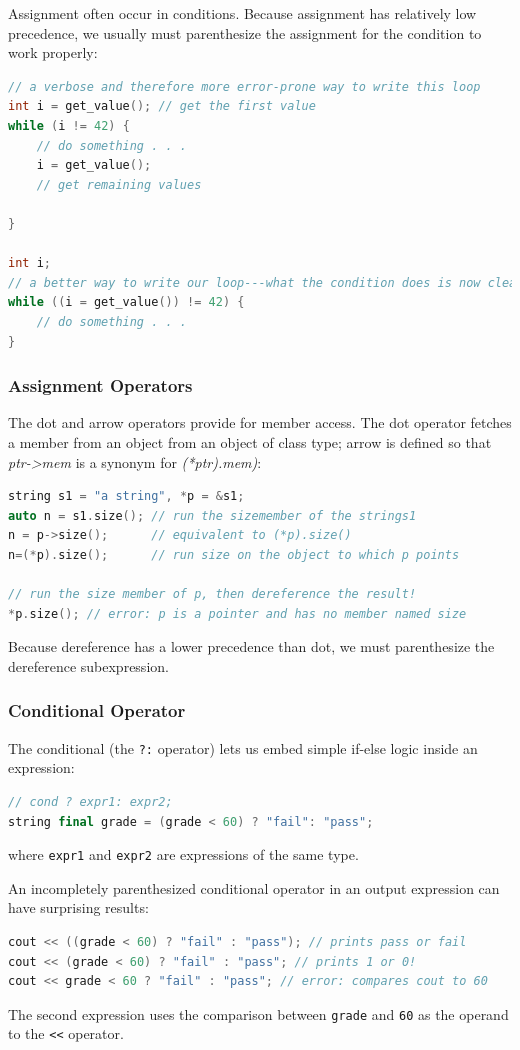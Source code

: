 Assignment often occur in conditions. Because assignment has relatively low precedence, we usually must parenthesize the assignment for the condition to work properly:
\begin{lstlisting}[language=C++]
// a verbose and therefore more error-prone way to write this loop 
int i = get_value(); // get the first value 
while (i != 42) { 
    // do something . . . 
    i = get_value(); 
    // get remaining values 

}

int i; 
// a better way to write our loop---what the condition does is now clearer 
while ((i = get_value()) != 42) { 
    // do something . . . 
}
\end{lstlisting}

\subsubsection{Assignment Operators}

The dot and arrow operators provide for member access. The dot operator fetches a member from an object from an object of class type; arrow is defined so that \textit{ptr->mem}  is a synonym for \textit{(*ptr).mem)}:
\begin{lstlisting}[language=C++]
string s1 = "a string", *p = &s1; 
auto n = s1.size(); // run the sizemember of the strings1 
n = p->size();      // equivalent to (*p).size()
n=(*p).size();      // run size on the object to which p points 

// run the size member of p, then dereference the result! 
*p.size(); // error: p is a pointer and has no member named size
\end{lstlisting}
Because dereference has a lower precedence than dot, we must parenthesize the dereference subexpression.

\subsubsection{Conditional Operator}

The conditional (the \texttt{?:} operator) lets us embed simple if-else logic inside an expression:
\begin{lstlisting}[language=C++]
// cond ? expr1: expr2;
string final grade = (grade < 60) ? "fail": "pass";
\end{lstlisting}
where \texttt{expr1} and \texttt{expr2} are expressions of the same type.

An incompletely parenthesized conditional operator in an output expression can have surprising results:
\begin{lstlisting}[language=C++]
cout << ((grade < 60) ? "fail" : "pass"); // prints pass or fail 
cout << (grade < 60) ? "fail" : "pass"; // prints 1 or 0! 
cout << grade < 60 ? "fail" : "pass"; // error: compares cout to 60
\end{lstlisting}
The second expression uses the comparison between \texttt{grade} and \texttt{60} as the operand to the \texttt{<<} operator. 

